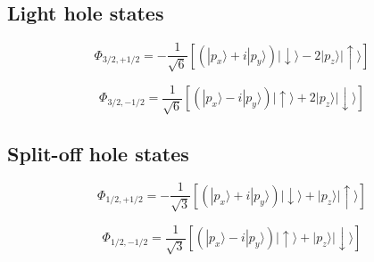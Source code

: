 \subsection*{Light hole states}
\begin{equation}
	\boxed{
		\Phi_{3/2, +1/2} = -\frac{1}{\sqrt{6}} \left[ \left( |p_x\rangle + i |p_y\rangle \right) |\downarrow\rangle - 2 |p_z\rangle |\uparrow\rangle \right]
	}
\end{equation}

\begin{equation}
	\boxed{
		\Phi_{3/2, -1/2} = \frac{1}{\sqrt{6}} \left[ \left( |p_x\rangle - i |p_y\rangle \right) |\uparrow\rangle + 2 |p_z\rangle |\downarrow\rangle \right]
	}
\end{equation}

\subsection*{Split-off hole states}
\begin{equation}
	\boxed{
		\Phi_{1/2, +1/2} = -\frac{1}{\sqrt{3}} \left[ \left( |p_x\rangle + i |p_y\rangle \right) |\downarrow\rangle + |p_z\rangle |\uparrow\rangle \right]
	}
\end{equation}

\begin{equation}
	\boxed{
		\Phi_{1/2, -1/2} = \frac{1}{\sqrt{3}} \left[ \left( |p_x\rangle - i |p_y\rangle \right) |\uparrow\rangle + |p_z\rangle |\downarrow\rangle \right]
	}
\end{equation}

